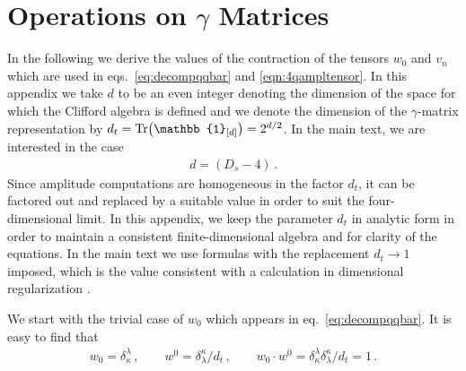 \chapter{Operations on \texorpdfstring{$\gamma$}{Gamma} Matrices}\label{sec:identities}


In the following we derive the values of the contraction of the
tensors $w_0$ and $v_n$ which are used in 
eqs.~\eqref{eq:decompqqbar} and \eqref{eqn:4qampltensor}.
%
In this appendix we take $d$ to be an even integer denoting the
dimension of the space for which the Clifford algebra is defined
and we denote the dimension of the $\gamma$-matrix
representation by
$d_t=\Tr(\mathbb{1}_{[d]})=2^{d/2}$.
In the main text, we are interested in the case
%
\begin{eqnarray}
  d = (D_s-4)\,.
\end{eqnarray}
%
Since amplitude computations are homogeneous in the
factor $d_t$, it can be factored out and replaced by 
a suitable value in order to suit the four-dimensional 
limit. In this appendix, we keep the parameter $d_t$ in analytic
form in order to maintain a consistent finite-dimensional
algebra and for clarity of the equations. 
In the main text we use formulas with the replacement
$d_t\rightarrow 1$ imposed, which is the value consistent with a
calculation in dimensional regularization \cite{Collins:1984xc}.

We start with the trivial case of $w_0$ which appears in 
eq.~\eqref{eq:decompqqbar}. It is easy to find that
%
\begin{eqnarray}
  w_0=\delta_\kappa^\lambda\,,\qquad 
  w^0=\delta^\kappa_\lambda/d_t\,,\qquad 
  w_0\cdot w^0=\delta_\kappa^\lambda  \delta^\kappa_\lambda/d_t=1\,.
\end{eqnarray}

